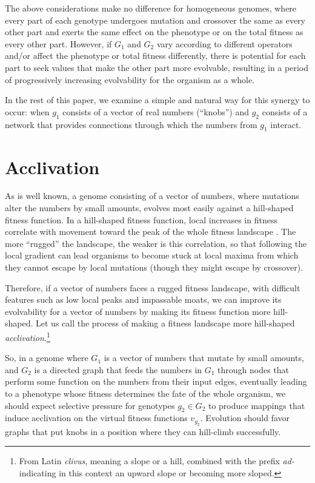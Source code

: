 \documentclass[letterpaper]{article}
\begin{document}
The above considerations make no difference for homogeneous genomes, where
every part of each genotype undergoes mutation and crossover the same as every
other part and exerts the same effect on the phenotype or on the total fitness
as every other part. However, if $G_1$ and $G_2$ vary according to different
operators and/or affect the phenotype or total fitness differently, there is
potential for each part to seek values that make the other part more
evolvable, resulting in a period of progressively increasing evolvability for
the organism as a whole.

In the rest of this paper, we examine a simple and natural way for this
synergy to occur: when $g_1$ consists of a vector of real numbers (``knobs'')
and $g_2$ consists of a network that provides connections through which the
numbers from $g_1$ interact.

\section{Acclivation}

As is well known, a genome consisting of a vector of numbers, where mutations
alter the numbers by small amounts, evolves most easily against a hill-shaped
fitness function. In a hill-shaped fitness function, local increases in
fitness correlate with movement toward the peak of the whole fitness
landscape \citep{kauffman1987towards}. The more ``rugged'' the landscape, the
weaker is this correlation, so that following the local gradient can lead
organisms to become stuck at local maxima from which they cannot escape by
local mutations (though they might escape by crossover).

Therefore, if a vector of numbers faces a rugged fitness landscape, with
difficult features such as low local peaks and impassable moats, we can
improve its evolvability for a vector of numbers by making its fitness
function more hill-shaped. Let us call the process of making a fitness
landscape more hill-shaped \textit{acclivation.}\footnote{From
Latin \textit{clivus}, meaning a
slope or a hill, combined with the prefix \textit{ad-} indicating in this
context an upward slope or becoming more sloped.}

So, in a genome where $G_1$ is a vector of numbers that mutate by small
amounts, and $G_2$ is a directed graph that feeds the numbers in $G_1$ through
nodes that perform some function on the numbers from their input edges,
eventually leading to a phenotype whose fitness determines the fate of the
whole organism, we should expect selective pressure for genotypes $g_2 \in
G_2$ to produce mappings that induce acclivation on the virtual fitness
functions $v_{g_2}$. Evolution should favor graphs that put knobs in a
position where they can hill-climb successfully.
\end{document}
